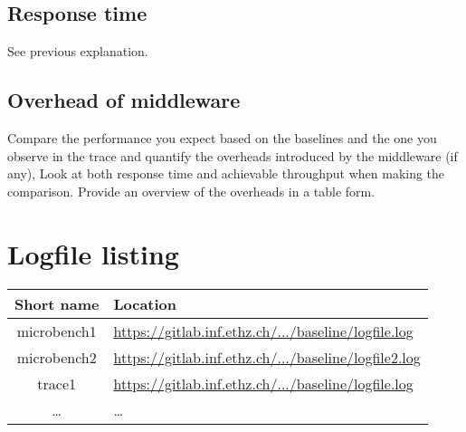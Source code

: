 \documentclass[11pt]{article}
\begin{document}
\subsection{Response time}
See previous explanation.

\subsection{Overhead of middleware}

Compare the performance you expect based on the baselines and the one you observe in the trace and quantify the overheads introduced by the middleware (if any), Look at both response time and achievable throughput when making the comparison. Provide an overview of the overheads in a table form.


\pagebreak

\section*{Logfile listing}

\begin{tabular}{|c|l|}
\hline \textbf{Short name }& \textbf{Location} \\ 
\hline microbench1 & \url{https://gitlab.inf.ethz.ch/.../baseline/logfile.log} \\ 
\hline microbench2 & \url{https://gitlab.inf.ethz.ch/.../baseline/logfile2.log} \\ 
\hline trace1 & \url{https://gitlab.inf.ethz.ch/.../baseline/logfile.log} \\ 
\hline \dots & \dots \\ 
\hline 
\end{tabular} 
\end{document}
